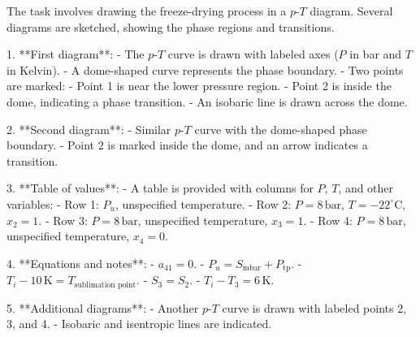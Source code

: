 The task involves drawing the freeze-drying process in a \( p \)-\( T \) diagram. Several diagrams are sketched, showing the phase regions and transitions.  

1. **First diagram**:  
   - The \( p \)-\( T \) curve is drawn with labeled axes (\( P \) in bar and \( T \) in Kelvin).  
   - A dome-shaped curve represents the phase boundary.  
   - Two points are marked:  
     - Point 1 is near the lower pressure region.  
     - Point 2 is inside the dome, indicating a phase transition.  
   - An isobaric line is drawn across the dome.  

2. **Second diagram**:  
   - Similar \( p \)-\( T \) curve with the dome-shaped phase boundary.  
   - Point 2 is marked inside the dome, and an arrow indicates a transition.  

3. **Table of values**:  
   - A table is provided with columns for \( P \), \( T \), and other variables:  
     - Row 1: \( P_u \), unspecified temperature.  
     - Row 2: \( P = 8 \, \text{bar} \), \( T = -22^\circ\text{C} \), \( x_2 = 1 \).  
     - Row 3: \( P = 8 \, \text{bar} \), unspecified temperature, \( x_3 = 1 \).  
     - Row 4: \( P = 8 \, \text{bar} \), unspecified temperature, \( x_4 = 0 \).  

4. **Equations and notes**:  
   - \( a_{41} = 0 \).  
   - \( P_u = S_{\text{mbar}} + P_{\text{tp}} \).  
   - \( T_i - 10 \, \text{K} = T_{\text{sublimation point}} \).  
   - \( S_3 = S_2 \).  
   - \( T_i - T_3 = 6 \, \text{K} \).  

5. **Additional diagrams**:  
   - Another \( p \)-\( T \) curve is drawn with labeled points 2, 3, and 4.  
   - Isobaric and isentropic lines are indicated.